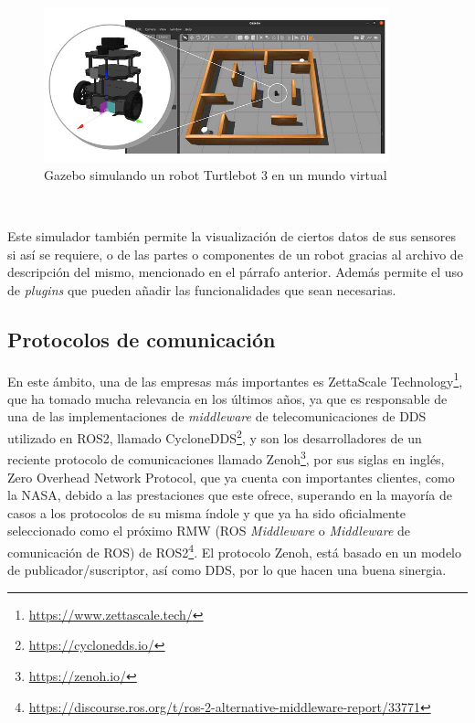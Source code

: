 \begin{figure} [h!]
  \begin{center}
    \includegraphics[width=10cm]{figs/gazebo_sim}
  \end{center}
  \caption{Gazebo simulando un robot Turtlebot 3 en un mundo virtual \cite{gazebo}}
  \label{fig:gazebo_sim}
\end{figure}\

Este simulador también permite la visualización de ciertos datos de sus sensores
si así se requiere, o de las partes o componentes de un robot gracias al archivo
de descripción del mismo, mencionado en el párrafo anterior.
Además permite el uso de \textit{plugins} que pueden añadir las funcionalidades
que sean necesarias.
\\


\subsection{Protocolos de comunicación}
\label{sec:protocolos_comunicacion}

En este ámbito, una de las empresas más importantes es ZettaScale
Technology\footnote{\url{https://www.zettascale.tech/}}, que ha tomado mucha
relevancia en los últimos años, ya que es responsable de una de las
implementaciones de \textit{middleware} de telecomunicaciones de DDS utilizado
en ROS2, llamado CycloneDDS\footnote{\url{https://cyclonedds.io/}}, y son los
desarrolladores de un reciente protocolo de comunicaciones llamado
Zenoh\footnote{\url{https://zenoh.io/}}, por sus siglas en inglés, Zero Overhead
Network Protocol, que ya cuenta con importantes clientes, como la NASA, debido a
las prestaciones que este ofrece, superando en la mayoría de casos a los
protocolos de su misma índole y que ya ha sido oficialmente seleccionado como el
próximo RMW (ROS \textit{Middleware} o \textit{Middleware} de comunicación de
ROS) de ROS2\footnote{
\url{https://discourse.ros.org/t/ros-2-alternative-middleware-report/33771}}.
El protocolo Zenoh, está basado en un modelo de publicador/suscriptor, así como
DDS, por lo que hacen una buena sinergia.
\\

